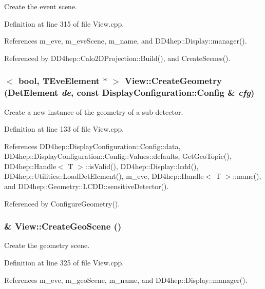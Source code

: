 Create the event scene. 

Definition at line 315 of file View.cpp.

References m\_\-eve, m\_\-eveScene, m\_\-name, and DD4hep::Display::manager().

Referenced by DD4hep::Calo2DProjection::Build(), and CreateScenes().\hypertarget{class_d_d4hep_1_1_view_aa2325d2c428a2d2523bfb82cd31b7a28}{
\subsubsection[{CreateGeometry}]{$<$ bool, TEveElement $\ast$ $>$ View::CreateGeometry ({\bf DetElement} {\em de}, \/  const {\bf DisplayConfiguration::Config} \& {\em cfg})}}
\label{class_d_d4hep_1_1_view_aa2325d2c428a2d2523bfb82cd31b7a28}


Create a new instance of the geometry of a sub-\/detector. 

Definition at line 133 of file View.cpp.

References DD4hep::DisplayConfiguration::Config::data, DD4hep::DisplayConfiguration::Config::Values::defaults, GetGeoTopic(), DD4hep::Handle$<$ T $>$::isValid(), DD4hep::Display::lcdd(), DD4hep::Utilities::LoadDetElement(), m\_\-eve, DD4hep::Handle$<$ T $>$::name(), and DD4hep::Geometry::LCDD::sensitiveDetector().

Referenced by ConfigureGeometry().\hypertarget{class_d_d4hep_1_1_view_a8738a88e61d962553fe86472b294028b}{
\subsubsection[{CreateGeoScene}]{ \& View::CreateGeoScene ()}}
\label{class_d_d4hep_1_1_view_a8738a88e61d962553fe86472b294028b}


Create the geometry scene. 

Definition at line 325 of file View.cpp.

References m\_\-eve, m\_\-geoScene, m\_\-name, and DD4hep::Display::manager().

